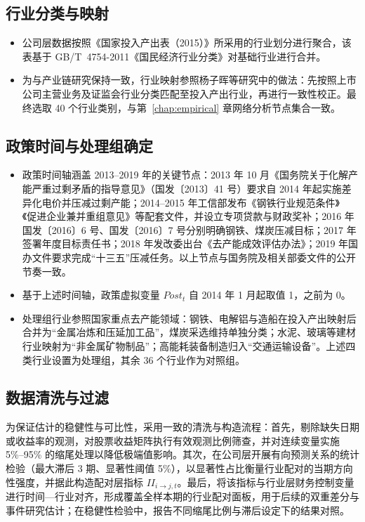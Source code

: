 \subsection{行业分类与映射}
\begin{itemize}
    \item 公司层数据按照《国家投入产出表（2015）》所采用的行业划分进行聚合，该表基于 GB/T~4754-2011《国民经济行业分类》对基础行业进行合并。
    \item 为与产业链研究保持一致，行业映射参照杨子晖等研究中的做法：先按照上市公司主营业务及证监会行业分类匹配至投入产出行业，再进行一致性校正。最终选取 40 个行业类别，与第~\ref{chap:empirical} 章网络分析节点集合一致。
\end{itemize}

\subsection{政策时间与处理组确定}
\label{sec:policy_timeline}
\begin{itemize}
    \item 政策时间轴涵盖 2013--2019 年的关键节点：2013 年 10 月《国务院关于化解产能严重过剩矛盾的指导意见》（国发〔2013〕41 号）要求自 2014 年起实施差异化电价并压减过剩产能；2014--2015 年工信部发布《钢铁行业规范条件》《促进企业兼并重组意见》等配套文件，并设立专项贷款与财政奖补；2016 年国发〔2016〕6 号、国发〔2016〕7 号分别明确钢铁、煤炭压减目标；2017 年签署年度目标责任书；2018 年发改委出台《去产能成效评估办法》；2019 年国办文件要求完成“十三五”压减任务。以上节点与国务院及相关部委文件的公开节奏一致。
    \item 基于上述时间轴，政策虚拟变量 \(Post_t\) 自 2014 年 1 月起取值 1，之前为 0。
    \item 处理组行业参照国家重点去产能领域：钢铁、电解铝与造船在投入产出映射后合并为“金属冶炼和压延加工品”，煤炭采选维持单独分类；水泥、玻璃等建材行业映射为“非金属矿物制品”；高能耗装备制造归入“交通运输设备”。上述四类行业设置为处理组，其余 36 个行业作为对照组。
\end{itemize}

\subsection{数据清洗与过滤}
为保证估计的稳健性与可比性，采用一致的清洗与构造流程：首先，剔除缺失日期或收益率的观测，对股票收益矩阵执行有效观测比例筛查，并对连续变量实施 5\%--95\% 的缩尾处理以降低极端值影响。其次，在公司层开展有向预测关系的统计检验（最大滞后 3 期、显著性阈值 5\%），以显著性占比衡量行业配对的当期方向性强度，并据此构造配对层指标 \(II_{i\to j,t}\)。最后，将该指标与行业层财务控制变量进行时间—行业对齐，形成覆盖全样本期的行业配对面板，用于后续的双重差分与事件研究估计；在稳健性检验中，报告不同缩尾比例与滞后设定下的结果对照。
